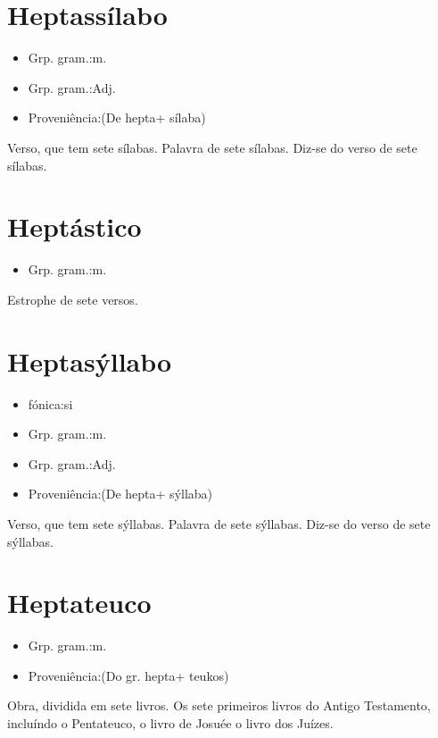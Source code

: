 \documentclass{article}
\begin{document}
\section{Heptassílabo}
\begin{itemize}
\item {Grp. gram.:m.}
\end{itemize}
\begin{itemize}
\item {Grp. gram.:Adj.}
\end{itemize}
\begin{itemize}
\item {Proveniência:(De \textunderscore hepta\textunderscore  + \textunderscore sílaba\textunderscore )}
\end{itemize}
Verso, que tem sete sílabas.
Palavra de sete sílabas.
Diz-se do verso de sete sílabas.
\section{Heptástico}
\begin{itemize}
\item {Grp. gram.:m.}
\end{itemize}
Estrophe de sete versos.
\section{Heptasýllabo}
\begin{itemize}
\item {fónica:si}
\end{itemize}
\begin{itemize}
\item {Grp. gram.:m.}
\end{itemize}
\begin{itemize}
\item {Grp. gram.:Adj.}
\end{itemize}
\begin{itemize}
\item {Proveniência:(De \textunderscore hepta\textunderscore  + \textunderscore sýllaba\textunderscore )}
\end{itemize}
Verso, que tem sete sýllabas.
Palavra de sete sýllabas.
Diz-se do verso de sete sýllabas.
\section{Heptateuco}
\begin{itemize}
\item {Grp. gram.:m.}
\end{itemize}
\begin{itemize}
\item {Proveniência:(Do gr. \textunderscore hepta\textunderscore  + \textunderscore teukos\textunderscore )}
\end{itemize}
Obra, dividida em sete livros.
Os sete primeiros livros do \textunderscore Antigo Testamento\textunderscore , incluíndo o \textunderscore Pentateuco\textunderscore , o livro de \textunderscore Josué\textunderscore  e o livro dos \textunderscore Juízes\textunderscore .
\end{document}
